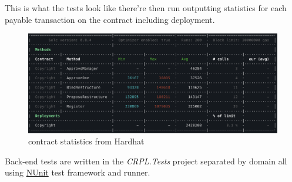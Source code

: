 This is what the tests look like there're then run outputting statistics for each payable transaction on the contract including deployment.

\begin{figure}[H]
\caption{contract statistics from Hardhat}
\centering
\includegraphics[width=\textwidth,height=0.4\textheight,keepaspectratio]{images/appendix/tests/hardhat-results}
\centering
\end{figure}

Back-end tests are written in the \textit{CRPL.Tests} project separated by domain all using \href{https://nunit.org/}{NUnit} test framework and runner.

